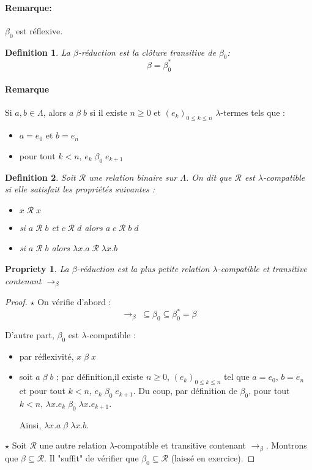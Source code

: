 \documentclass{article}
\newtheorem{prop}{Propriety}
\newtheorem{defi}{Definition}
\newcommand\lterm[2]{\lambda #1. #2}
\begin{document}
\paragraph{Remarque:} $\beta_0$ est réflexive.

\begin{defi}
La \emph{$\beta$-réduction} est la clôture transitive de $\beta_0$:
\[\beta = \beta_0^* \]
\end{defi}


\paragraph{Remarque}
Si $a,b \in \Lambda$, alors $a \; \beta \; b$ si il existe $n\geq 0$ et $(e_k)_{0\leq k \leq n}$ $\lambda$-termes tels que :
\begin{itemize}
\item $a=e_0$ et $b=e_n$
\item pour tout $k<n$, $e_k \; \beta_0 \; e_{k+1}$
\end{itemize}

\begin{defi}
Soit $\mathcal{R}$ une relation binaire sur $\Lambda$. On dit que $\mathcal{R}$ est \emph{$\lambda$-compatible} si elle satisfait les propriétés suivantes :
\begin{itemize}
\item $x\;\mathcal{R}\; x$
\item si $a \; \mathcal{R} \; b$ et $c \;\mathcal{R}\; d$ alors $a\; c\; \mathcal{R} \; b \; d$
\item si $a\; \mathcal{R}\; b$ alors $\lambda x.a\; \mathcal{R}\; \lambda x.b$
\end{itemize}
\end{defi}

\begin{prop}
La $\beta$-réduction est la plus petite relation $\lambda$-compatible et transitive contenant $\to_{\beta}$
\end{prop}

\begin{proof}
$\star$ On vérifie d'abord :
\[\to_\beta \; \subseteq \beta_0 \subseteq \beta_0^* = \beta \]

D'autre part, $\beta_0$ est $\lambda$-compatible :
\begin{itemize}
\item par réflexivité, $x \; \beta	\; x$
\item soit $a\; \beta \; b$ ; par définition,il existe $n\geq 0$, $(e_k)_{0\leq k \leq n}$ tel que $a=e_0$, $b=e_n$ et pour tout $k<n$, $e_k \; \beta_0 \; e_{k+1}$. Du coup, par définition de $\beta_0$, pour tout $k<n$, $\lterm{x}{e_k} \; \beta_0 \; \lterm{x}{e_{k+1}}$.

Ainsi, $\lterm{x}{a} \; \beta \; \lterm{x}{b}$.
\end{itemize}

$\star$ Soit $\mathcal{R}$ une autre relation $\lambda$-compatible et transitive contenant $\to_\beta$. Montrons que $\beta\subseteq \mathcal{R}$. Il "suffit" de vérifier que $\beta_0 \subseteq \mathcal{R}$ (laissé en exercice).
\end{proof}
\end{document}
